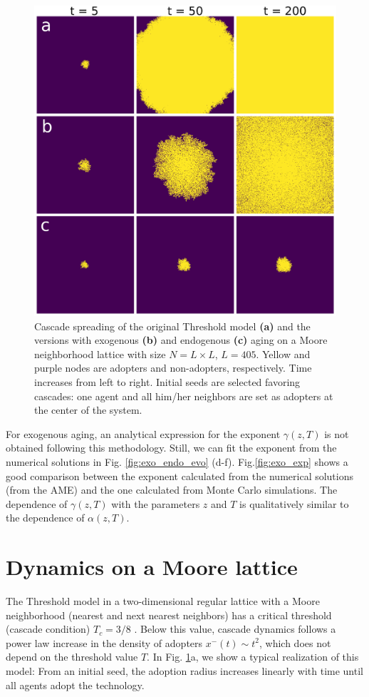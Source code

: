 \begin{figure}
    \centering \captionsetup{font=sf}
    \includegraphics[width=0.5\columnwidth]{Figs/Aging_Threshold/LATT_PLOT.png}
    \caption[Cascade spreading of the Threshold model in a lattice]{\label{fig:evo_lat} Cascade spreading of the original Threshold model \textbf{(a)} and the versions with exogenous \textbf{(b)} and endogenous \textbf{(c)} aging on a Moore neighborhood lattice with size $N = L \times L$, $L = 405$. Yellow and purple nodes are adopters and non-adopters, respectively. Time increases from left to right. Initial seeds are selected favoring cascades: one agent and all him/her neighbors are set as adopters at the center of the system.}
\end{figure}

For exogenous aging, an analytical expression for the exponent $\gamma(z,T)$ is not obtained following this methodology. Still, we can fit the exponent from the numerical solutions in Fig. \ref{fig:exo_endo_evo} (d-f). Fig.\ref{fig:exo_exp} shows a good comparison between the exponent calculated from the numerical solutions (from the AME) and the one calculated from  Monte Carlo simulations. The dependence of $\gamma(z,T)$ with the parameters $z$ and $T$ is qualitatively similar to the dependence of  $\alpha(z,T)$.

\section{\label{sec:Lattice} Dynamics on a Moore lattice}

The Threshold model in a two-dimensional regular lattice with a Moore neighborhood (nearest and next nearest neighbors) has a critical threshold (cascade condition) $T_c = 3/8$ \cite{centola-2007}. Below this value, cascade dynamics follows a power law increase in the density of adopters $x^{-}(t) \sim t^2$, which does not depend on the threshold value $T$. In Fig. \ref{fig:evo_lat}a, we show a typical realization of this model: From an initial seed, the adoption radius increases linearly with time until all agents adopt the technology.

